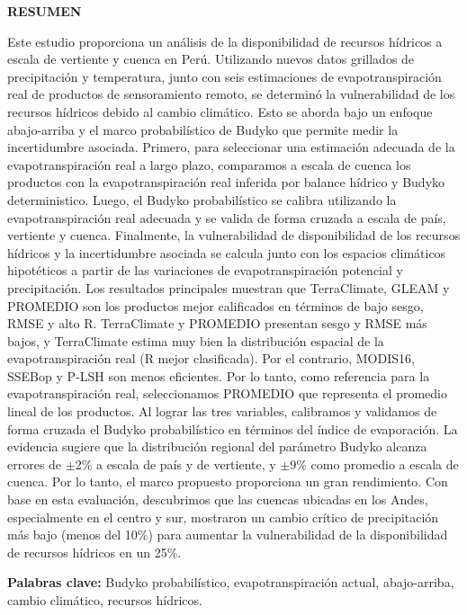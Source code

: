 \begin{center}
\large{\textbf {RESUMEN}}
\end{center}

Este estudio proporciona un análisis de la disponibilidad de recursos hídricos a escala de vertiente y cuenca en Perú. Utilizando nuevos datos grillados de precipitación y temperatura, junto con seis estimaciones de evapotranspiración real de productos de sensoramiento remoto, se determinó la vulnerabilidad de los recursos hídricos debido al cambio climático. Esto se aborda bajo un enfoque abajo-arriba y el marco probabilístico de Budyko que permite medir la incertidumbre asociada. Primero, para seleccionar una estimación adecuada de la evapotranspiración real a largo plazo, comparamos a escala de cuenca los productos con la evapotranspiración real inferida por balance hídrico y Budyko deterministico. Luego, el Budyko probabilístico se calibra utilizando la evapotranspiración real adecuada y se valida de forma cruzada a escala de país, vertiente y cuenca. Finalmente, la vulnerabilidad de disponibilidad de los recursos hídricos y la incertidumbre asociada se calcula junto con los espacios climáticos hipotéticos a partir de las variaciones de evapotranspiración potencial y precipitación. Los resultados principales muestran que TerraClimate, GLEAM y PROMEDIO son los productos mejor calificados en términos de bajo sesgo, RMSE y alto R. TerraClimate y PROMEDIO presentan sesgo y RMSE más bajos, y TerraClimate estima muy bien la distribución espacial de la evapotranspiración real (R mejor clasificada). Por el contrario, MODIS16, SSEBop y P‐LSH son menos eficientes. Por lo tanto, como referencia para la evapotranspiración real, seleccionamos PROMEDIO que representa el promedio lineal de los productos. Al lograr las tres variables, calibramos y validamos de forma cruzada el Budyko probabilístico en términos del índice de evaporación. La evidencia sugiere que la distribución regional del parámetro Budyko alcanza errores de $\pm$2\% a escala de país y de vertiente, y $\pm$9\% como promedio a escala de cuenca. Por lo tanto, el marco propuesto proporciona un gran rendimiento. Con base en esta evaluación, descubrimos que las cuencas ubicadas en los Andes, especialmente en el centro y sur, mostraron un cambio crítico de precipitación más bajo (menos del 10\%) para aumentar la vulnerabilidad de la disponibilidad de recursos hídricos en un 25\%.

\textbf {Palabras clave:} Budyko probabilístico, evapotranspiración actual, abajo-arriba, cambio climático, recursos hídricos.

